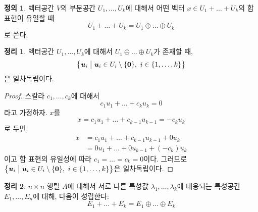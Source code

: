 \documentclass[unfonts,oneside,a4paper]{oblivoir}
\theoremstyle{definition}
\newtheorem{definition}{정의}[section]
\theoremstyle{theorem}
\newtheorem{theorem}{정리}[section]
\theoremstyle{theorem}
\theoremstyle{remark}
\theoremstyle{remark}
\theoremstyle{remark}
\theoremstyle{remark}
\renewcommand{\vec}[1]{\bm{\mathit{#1}}}
\newcommand{\vecz}{\bm{\mathrm{0}}}
\begin{document}
\begin{definition}
    벡터공간 $V$의 부분공간 $U_1, \dots, U_k$에 대해서 어떤 벡터 $\vec x \in U_1 + \dots + U_k$의 합 표현이 유일할 때
    \begin{equation*}
        U_1 + \dots + U_k = U_1 \oplus \dots \oplus U_k
    \end{equation*}
    로 쓴다.
\end{definition}

\begin{theorem} \label{thm:linear_independence_directsum}
    벡터공간 $U_1, \dots, U_k$에 대해서 $U_1 \oplus \dots \oplus U_k$가 존재할 때,
    \begin{equation*}
        \bigl\{\vec u_i \bigm| \vec u_i \in U_i \setminus \{\vecz\},\ i \in \{1, \dots, k\}\bigr\}
    \end{equation*}
    은 일차독립이다.
\end{theorem}

\begin{proof}
    스칼라 $c_1, \dots, c_k$에 대해서
    \begin{equation*}
        c_1 \vec u_1 + \dots + c_k \vec u_k = \vecz
    \end{equation*}
    라고 가정하자.
    $\vec x$를
    \begin{equation*}
        \vec x = c_1 \vec u_1 + \dots + c_{k - 1} \vec u_{k - 1} = -c_k \vec u_k
    \end{equation*}
    로 두면,
    \begin{align*}
        \vec x &= c_1 \vec u_1 + \dots + c_{k - 1} \vec u_{k - 1} + 0 \vec u_k\\
               &= 0 \vec u_1 + \dots + 0 \vec u_{k - 1} + (-c_k) \vec u_k
    \end{align*}
    이고 합 표현의 유일성에 따라 $c_1 = \dots = c_k = 0$이다.
    그러므로 $\bigl\{\vec u_i \bigm| \vec u_i \in U_i \setminus \{\vecz\},\ i \in \{1, \dots, k\}\bigr\}$은 일차독립이다.
\end{proof}

\begin{theorem} \label{thm:eigenspace_directsum}
    $n \times n$ 행렬 $A$에 대해서 서로 다른 특성값 $\lambda_1, \dots, \lambda_k$에 대응되는 특성공간 $E_1, \dots, E_n$에 대해, 다음이 성립한다:
    \begin{equation*}
        E_1 + \dots + E_k = E_1 \oplus \dots \oplus E_k
    \end{equation*}
\end{theorem}
\end{document}

